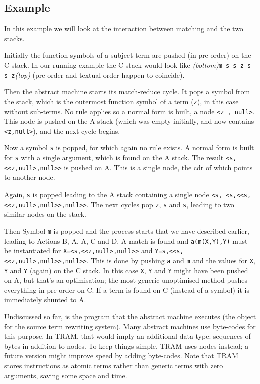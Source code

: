 \documentclass[11pt,twoside]{memoir}
\def\I{\textit} %
\def\T{\texttt}
\begin{document}
\subsection{Example}
In this example we will look at the interaction between matching and the two stacks. 

Initially the function symbols of a subject term are pushed (in pre-order) on the C-stack. In our running example the C stack would look like \I{(bottom)}\T{m s s z s s z}\I{(top)} (pre-order and textual order happen to coincide).

Then the abstract machine starts its match-reduce cycle. It pops a symbol from the stack, which is the outermost function symbol of a term (\T{z}), in this case without sub-terms. No rule applies so a normal form is built, a node \T{<z , null>}. This node is pushed on the A stack (which was empty initially, and now contains \T{<z,null>}), and the next cycle begins.

Now a symbol \T{s} is popped, for which again no rule exists. A normal form is built for \T{s} with a single argument, which is found on the A stack. The result \T{<s,<<z,null>,null>>} is pushed on A. This is a single node, the cdr of which points to another node.

Again, \T{s} is popped leading to the A stack containing a single node  \T{<s, <s,<<s,<<z,null>,null>>,null>>}. The next cycles pop \T{z}, \T{s} and \T{s}, leading to two similar nodes on the stack.

Then Symbol \T{m} is popped and the process starts that we have described earlier, leading to Actions B, A, A, C and D. A match is found and \T{a(m(X,Y),Y)} must be instantiated for \T{X=<s,<<z,null>,null>>} and \T{Y=s,<<s,<<z,null>,null>>,null>>}. This is done by pushing \T{a} and \T{m} and the values for \T{X}, \T{Y} and \T{Y} (again) on the C stack. In this case \T{X}, \T{Y} and \T{Y} might have been pushed on A, but that's an optimisation; the most generic unoptimised method pushes everything in pre-order on C. If a term is found on C (instead of a symbol) it is immediately shunted to A.

Undiscussed so far, is the program that the abstract machine executes (the object for the source term rewriting system). Many abstract machines use byte-codes for this purpose. In TRAM, that would imply an additional data type: sequences of bytes in addition to nodes. To keep things simple, TRAM uses nodes instead; a future version might improve speed by adding byte-codes. Note that TRAM stores instructions as atomic terms rather than generic terms with zero arguments, saving some space and time.
\end{document}

